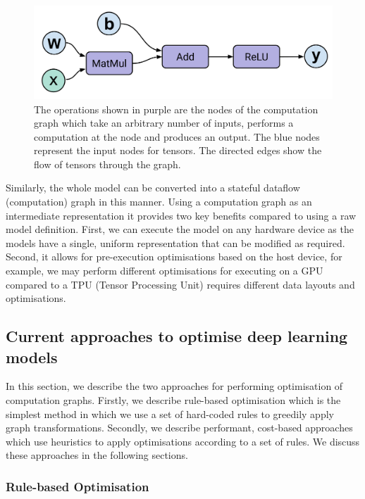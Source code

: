 \begin{figure}[ht]
  \centering
  \includegraphics[width=0.75\columnwidth]{sections/2background/images/dataflow}
  \caption[Single perceptron as a computation graph]{The operations shown in purple are the nodes of the computation graph which take an arbitrary number of inputs, performs a computation at the node and produces an output. The blue nodes represent the input nodes for tensors. The directed edges show the flow of tensors through the graph.}
  \label{fig:bg:perceptron}
\end{figure}

Similarly, the whole model can be converted into a stateful dataflow (computation) graph in this manner. Using a computation graph as an intermediate representation it provides two key benefits compared to using a raw model definition. First, we can execute the model on any hardware device as the models have a single, uniform representation that can be modified as required. Second, it allows for pre-execution optimisations based on the host device, for example, we may perform different optimisations for executing on a GPU compared to a TPU (Tensor Processing Unit) requires different data layouts and optimisations.

\subsection{Current approaches to optimise deep learning models}
\label{sec:bg:subsec:currentapp}

In this section, we describe the two approaches for performing optimisation of computation graphs. Firstly, we describe rule-based optimisation which is the simplest method in which we use a set of hard-coded rules to greedily apply graph transformations. Secondly, we describe performant, cost-based approaches which use heuristics to apply optimisations according to a set of rules. We discuss these approaches in the following sections.

\subsubsection{Rule-based Optimisation}
\label{sec:bg:subsec:rbo}

